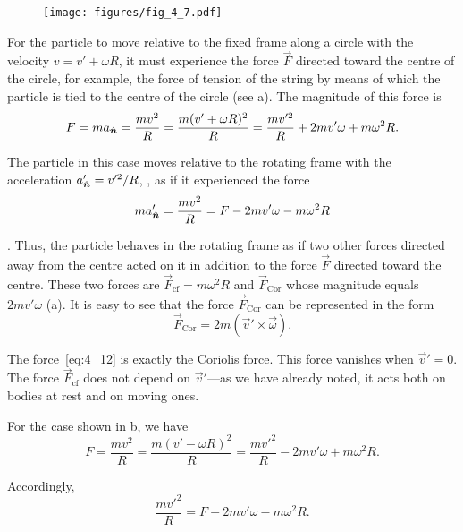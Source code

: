 \begin{figure}[t]
	\begin{center}
		\texttt{[image: figures/fig\_4\_7.pdf]}
		\caption[]{}
		\label{fig:4_7}
	\end{center}
\end{figure}

For the particle to move relative to the fixed frame along a circle with the velocity $v=v'+\omega R$, it must experience the force $\vec{F}$ directed  toward the centre of the circle, for example, the force of tension of the string by means of which the particle is tied to the centre of the circle (see a). The magnitude of this force is
\begin{equation}\label{eq:4_10}
F = m a_{\hat{\boldsymbol{n}}} = \frac{mv^2}{R} = \frac{m(v'+\omega R)^2}{R} = \frac{mv'^2}{R} + 2mv'\omega + m\omega^2 R.
\end{equation}

\noindent
The particle in this case moves relative to the rotating frame with the acceleration $a_{\hat{\boldsymbol{n}}}'=v'^2/R$, \ie, as if it experienced the force
\begin{equation}\label{eq:4_11}
m a_{\hat{\boldsymbol{n}}}' = \frac{mv^2}{R} = F - 2mv'\omega - m\omega^2 R
\end{equation}

. Thus, the particle behaves in the rotating frame as if two other forces directed away from the centre acted on it in addition to the force $\vec{F}$ directed toward the centre. These two forces are $\vec{F}_{\text{cf}}=m\omega^2 R$ and $\vec{F}_{\text{Cor}}$ whose magnitude equals $2mv'\omega$ (a). It is easy to see that the force $\vec{F}_{\text{Cor}}$ can be represented in the form
\begin{equation}\label{eq:4_12}
\vec{F}_{\text{Cor}} = 2m(\vec{v}'\times\vec{\omega}).
\end{equation}

\noindent
The force~\eqref{eq:4_12} is exactly the Coriolis force. This force vanishes when $\vec{v}'=0$. The force $\vec{F}_{\text{cf}}$ does not depend on $\vec{v}'$---as we have already noted, it acts both on bodies at rest and on moving ones.

For the case shown in b, we have
\begin{equation*}
	F = \frac{mv^2}{R} = \frac{m(v'-\omega R)^2}{R} = \frac{mv'^2}{R} - 2mv'\omega + m\omega^2 R.
\end{equation*}

\noindent
Accordingly,
\begin{equation*}
\frac{mv'^2}{R} = F + 2mv'\omega - m\omega^2 R.
\end{equation*}

